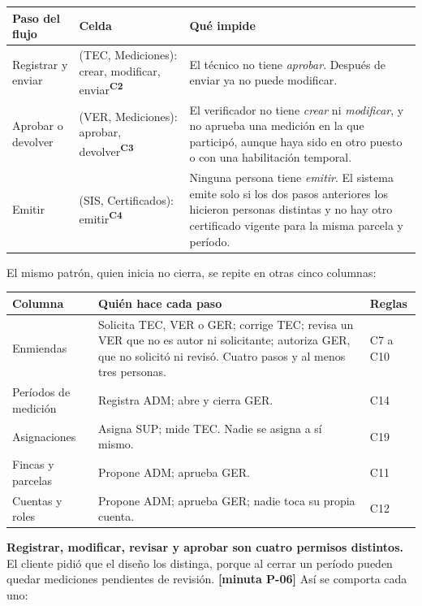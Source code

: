 \documentclass[11pt,letterpaper]{article}
\newcommand{\cab}[1]{\textbf{\rmfamily #1}}
\newcommand{\resp}[1]{\textrm{\footnotesize\bfseries [minuta #1]}}
\newcommand{\cnd}[1]{\textsuperscript{\rmfamily\bfseries #1}}   %
\begin{document}
\begin{center}
\small
\renewcommand{\arraystretch}{1.25}
\begin{tabularx}{\textwidth}{@{}L{3.3cm} L{4.6cm} Y@{}}
\toprule
\cab{Paso del flujo} & \cab{Celda} & \cab{Qué impide} \\
\midrule
Registrar y enviar & (TEC, Mediciones): crear, modificar, enviar\cnd{C2} &
El técnico no tiene \emph{aprobar}. Después de enviar ya no puede modificar. \\
Aprobar o devolver & (VER, Mediciones): aprobar, devolver\cnd{C3} &
El verificador no tiene \emph{crear} ni \emph{modificar}, y no aprueba una medición en la que
participó, aunque haya sido en otro puesto o con una habilitación temporal. \\
Emitir & (SIS, Certificados): emitir\cnd{C4} &
Ninguna persona tiene \emph{emitir}. El sistema emite solo si los dos pasos anteriores los hicieron
personas distintas y no hay otro certificado vigente para la misma parcela y período. \\
\bottomrule
\end{tabularx}
\end{center}

El mismo patrón, quien inicia no cierra, se repite en otras cinco columnas:

\begin{center}
\small
\renewcommand{\arraystretch}{1.25}
\begin{tabularx}{\textwidth}{@{}L{3.3cm} Y L{2.2cm}@{}}
\toprule
\cab{Columna} & \cab{Quién hace cada paso} & \cab{Reglas} \\
\midrule
Enmiendas & Solicita TEC, VER o GER; corrige TEC; revisa un VER que no es autor ni solicitante; autoriza GER, que no solicitó ni revisó. Cuatro pasos y al menos tres personas. & C7 a C10 \\
Períodos de medición & Registra ADM; abre y cierra GER. & C14 \\
Asignaciones & Asigna SUP; mide TEC. Nadie se asigna a sí mismo. & C19 \\
Fincas y parcelas & Propone ADM; aprueba GER. & C11 \\
Cuentas y roles & Propone ADM; aprueba GER; nadie toca su propia cuenta. & C12 \\
\bottomrule
\end{tabularx}
\end{center}

\textbf{Registrar, modificar, revisar y aprobar son cuatro permisos distintos.} El cliente pidió que el
diseño los distinga, porque al cerrar un período pueden quedar mediciones pendientes de revisión.
\resp{P-06} Así se comporta cada uno:
\end{document}
